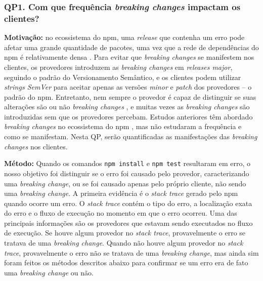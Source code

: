 \subsubsection{\large QP1. Com que frequência \textit{breaking changes} impactam os clientes?}
\label{sec:qp1}

\textbf{Motivação:}
no ecossistema do \textsf{npm}, uma \textit{release} que contenha um erro pode afetar uma grande quantidade de pacotes, uma vez que a rede de dependências do \textsf{npm} é relativamente densa \cite{teorical_reference:npm_2}. Para evitar que \textit{breaking changes} se manifestem nos clientes, os provedores introduzem as \textit{breaking changes} em \textit{releases major}, seguindo o padrão do Versionamento Semântico, e os clientes podem utilizar \textit{strings SemVer} para aceitar apenas as versões \textit{minor} e \textit{patch} dos provedores -- o padrão do \textsf{npm}. Entretanto, nem sempre o provedor é capaz de distinguir se suas alterações são ou não \textit{breaking changes} \cite{noregrets2018}, e muitas vezes as \textit{breaking changes} são introduzidas sem que os provedores percebam. Estudos anteriores têm abordado \textit{breaking changes} no ecossistema do \textsf{npm} \cite{using_others_tests, noregrets2018, intro:break_change, teorical_reference:bc_1}, mas não estudaram a frequência e como se manifestam. Nesta QP, serão quantificadas as manifestações das \textit{breaking changes} nos clientes.
\newline

\noindent
\textbf{Método:}
Quando os comandos \texttt{npm install} e \texttt{npm test} resultaram em erro, o nosso objetivo foi distinguir se o erro foi causado pelo provedor, caracterizando uma \textit{breaking change}, ou se foi causado apenas pelo próprio cliente, não sendo uma \textit{breaking change}. A primeira evidência é o \textit{stack trace} gerado pelo \textsf{npm} quando ocorre um erro. O \textit{stack trace} contém o tipo do erro, a localização exata do erro e o fluxo de execução no momento em que o erro ocorreu. Uma das principais informações são os provedores que estavam sendo executados no fluxo de execução. Se houve algum provedor no \textit{stack trace}, provavelmente o erro se tratava de uma \textit{breaking change}. Quando não houve algum provedor no \textit{stack trace}, provavelmente o erro não se tratava de uma \textit{breaking change}, mas ainda sim foram feitos os métodos descritos abaixo para confirmar se um erro era de fato uma \textit{breaking change} ou não.

